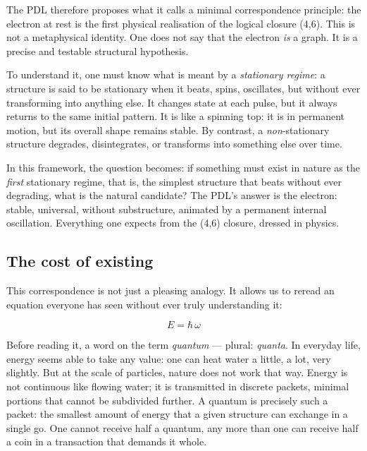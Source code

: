 \documentclass[12pt, a4paper, openright]{book}
\begin{document}
\medskip

The PDL therefore proposes what it calls a minimal correspondence principle: the electron at rest is the first physical realisation of the logical closure (4,6). This is not a metaphysical identity. One does not say that the electron \emph{is} a graph. It is a precise and testable structural hypothesis.

\medskip

To understand it, one must know what is meant by a \emph{stationary regime}: a structure is said to be stationary when it beats, spins, oscillates, but without ever transforming into anything else. It changes state at each pulse, but it always returns to the same initial pattern. It is like a spinning top: it is in permanent motion, but its overall shape remains stable. By contrast, a \emph{non}-stationary structure degrades, disintegrates, or transforms into something else over time.

\medskip

In this framework, the question becomes: if something must exist in nature as the \emph{first} stationary regime, that is, the simplest structure that beats without ever degrading, what is the natural candidate? The PDL’s answer is the electron: stable, universal, without substructure, animated by a permanent internal oscillation. Everything one expects from the (4,6) closure, dressed in physics.

\subsection*{The cost of existing}

This correspondence is not just a pleasing analogy. It allows us to reread an equation everyone has seen without ever truly understanding it:

\begin{equation}
E = \hbar\,\omega
\end{equation}

Before reading it, a word on the term \emph{quantum} — plural: \emph{quanta}. In everyday life, energy seems able to take any value: one can heat water a little, a lot, very slightly. But at the scale of particles, nature does not work that way. Energy is not continuous like flowing water; it is transmitted in discrete packets, minimal portions that cannot be subdivided further. A quantum is precisely such a packet: the smallest amount of energy that a given structure can exchange in a single go. One cannot receive half a quantum, any more than one can receive half a coin in a transaction that demands it whole.
\end{document}
